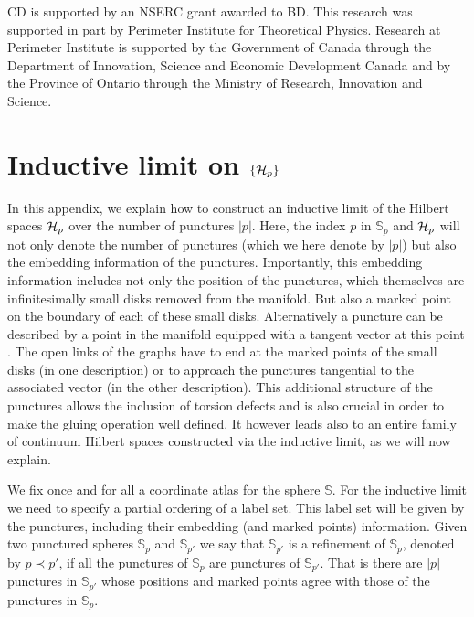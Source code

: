 \documentclass[nofootinbib,superscriptaddress,eqsecnum,tightenlines,11pt]{revtex4-1}
\renewcommand{\S}{{\mathbb S}}
\begin{document}
CD is supported by an NSERC grant awarded to BD.
This research was supported in part by Perimeter Institute for Theoretical Physics. Research at Perimeter Institute is supported by the Government of Canada through the Department of Innovation, Science and Economic Development Canada and by the Province of Ontario through the Ministry of Research, Innovation and Science.





\appendix






\newpage
\section{Inductive limit on $\{{\cal H}_p\}$\label{app_inductive}}

In this appendix, we explain how to construct an inductive limit of the Hilbert spaces ${\cal H}_p$ over the number of punctures $|p|$. Here, the index $p$ in $\mathbb{S}_p$ and ${\cal H}_p$ will not only denote the number of punctures (which we here denote by $|p|$) but also the embedding information of the punctures. Importantly, this embedding information includes not only the position of the punctures, which themselves are infinitesimally small disks removed from the manifold. But also a marked point on the boundary of each of these small disks. Alternatively a puncture can be described by a point in the manifold equipped with a tangent vector at this point \cite{Kir}. The open links of the graphs have to end at the marked points of the small disks (in one description) or to approach the punctures tangential to the associated vector (in the other description). 
This additional structure of the punctures allows the inclusion of torsion defects and is also crucial in order to make the gluing operation well defined. It however leads also to an entire family of continuum Hilbert spaces constructed via the inductive limit, as we will now explain.

We fix once and for all a coordinate atlas for the sphere $\mathbb{S}$. For the inductive limit we need to specify a partial ordering of a label set. This label set will be given by the punctures, including their embedding (and marked points) information. Given two punctured spheres $\S_p$ and $\S_{p'}$ we say that $\S_{p'}$ is a refinement of $\S_p$, denoted by $p \prec p'$, if all the punctures of $\S_p$ are punctures of $\S_{p'}$. That is there are $|p|$ punctures in $\S_{p'}$ whose positions and marked points agree with those of the punctures in $\S_p$.  
\end{document}
